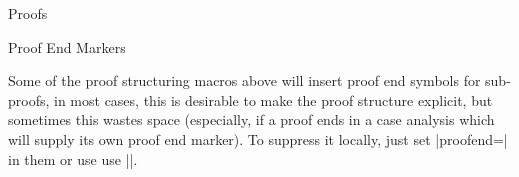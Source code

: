 \begin{sfragment}{Proofs}
\begin{sfragment}{Proof End Markers}
  
Some of the proof structuring macros above will insert proof end symbols for sub-proofs,
in most cases, this is desirable to make the proof structure explicit, but sometimes this
wastes space (especially, if a proof ends in a case analysis which will supply its own
proof end marker). To suppress it locally, just set |proofend={}| in them or use use
|\sProofEndSymbol{}|.
\end{sfragment}
\end{sfragment}

